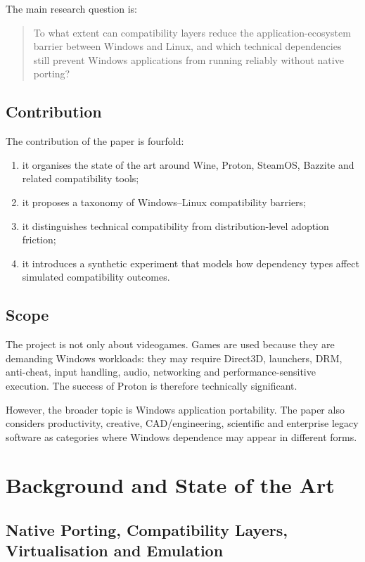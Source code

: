\documentclass[conference]{IEEEtran}
\begin{document}
The main research question is:

\begin{quote}
To what extent can compatibility layers reduce the application-ecosystem barrier between Windows and Linux, and which technical dependencies still prevent Windows applications from running reliably without native porting?
\end{quote}

\subsection{Contribution}

The contribution of the paper is fourfold:
\begin{enumerate}
    \item it organises the state of the art around Wine, Proton, SteamOS, Bazzite and related compatibility tools;
    \item it proposes a taxonomy of Windows--Linux compatibility barriers;
    \item it distinguishes technical compatibility from distribution-level adoption friction;
    \item it introduces a synthetic experiment that models how dependency types affect simulated compatibility outcomes.
\end{enumerate}

\subsection{Scope}

The project is not only about videogames. Games are used because they are demanding Windows workloads: they may require Direct3D, launchers, DRM, anti-cheat, input handling, audio, networking and performance-sensitive execution. The success of Proton is therefore technically significant.

However, the broader topic is Windows application portability. The paper also considers productivity, creative, CAD/engineering, scientific and enterprise legacy software as categories where Windows dependence may appear in different forms.

\section{Background and State of the Art}

\subsection{Native Porting, Compatibility Layers, Virtualisation and Emulation}
\end{document}
